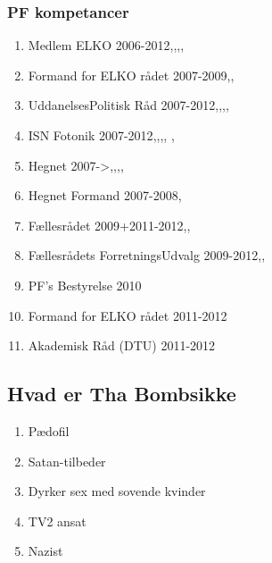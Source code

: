 \subsubsection{PF kompetancer}
\begin{enumerate}
\item Medlem ELKO 2006-2012\cite{bib:url:Beret2007},\cite{bib:url:Beret2008},\cite{bib:url:Beret2009},\cite{bib:url:Beret2010},\cite{bib:url:Beret2011}
\item Formand for ELKO rådet 2007-2009\cite{bib:url:Beret2007},\cite{bib:url:Beret2008},\cite{bib:url:Beret2009}
\item UddanelsesPolitisk Råd 2007-2012\cite{bib:url:Beret2007},\cite{bib:url:Beret2008},\cite{bib:url:Beret2009},\cite{bib:url:Beret2010},\cite{bib:url:Beret2011}
\item ISN Fotonik 2007-2012\cite{bib:url:Beret2007},\cite{bib:url:Beret2008},\cite{bib:url:Beret2009},\cite{bib:url:Beret2010},\cite{bib:url:Beret2011} , \cite{bib:url:ISNfoto}
\item Hegnet 2007->\cite{bib:url:Beret2007},\cite{bib:url:Beret2008},\cite{bib:url:Beret2009},\cite{bib:url:Beret2010},\cite{bib:url:Beret2011}
\item Hegnet Formand 2007-2008\cite{bib:url:Beret2007},\cite{bib:url:Beret2008}
\item Fællesrådet 2009+2011-2012\cite{bib:url:Beret2009},\cite{bib:url:Beret2010},\cite{bib:url:Beret2011}
\item Fællesrådets ForretningsUdvalg 2009-2012\cite{bib:url:Beret2009},\cite{bib:url:Beret2010},\cite{bib:url:Beret2011}
\item PF's Bestyrelse 2010\cite{bib:url:Beret2010}
\item Formand for ELKO rådet 2011-2012 \cite{bib:url:Beret2011}
\item Akademisk Råd (DTU) 2011-2012\cite{bib:url:Beret2011}
\end{enumerate}

\subsection{Hvad er Tha Bombs\texttrademark ikke}
\begin{enumerate}
\item Pædofil \cite{bib:url:Finn:Pedo}
\item Satan-tilbeder \cite{bib:url:Finn:Satan}
\item Dyrker sex med sovende kvinder \cite{bib:url:Finn:SovendeKvinder}
\item TV2 ansat \cite{bib:url:Finn:TV2}
\item Nazist\cite{bib:url:Finn:Nazist}
\end{enumerate}



